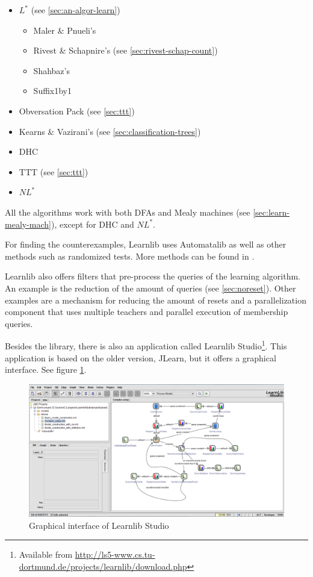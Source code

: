 \documentclass[multi,crop=false,class=article]{standalone}
\begin{document}
\begin{itemize}
	\item $L^*$ (see \cref{sec:an-algor-learn})
	\begin{itemize}
		\item Maler \& Pnueli's \cite{Maler1995}
		\item Rivest \& Schapnire's (see \cref{sec:rivest-schap-count})
		\item Shahbaz's \cite{Shahbaz2009}
		\item Suffix1by1 \cite{Irfan2010}
	\end{itemize}
	\item Obversation Pack (see \cref{sec:ttt})
	\item Kearns \& Vazirani's (see \cref{sec:classification-trees})
	\item DHC \cite{Merten2012}
	\item TTT (see \cref{sec:ttt})
	\item $NL^*$ \cite{Bollig2009}
\end{itemize}

All the algorithms work with both DFAs and Mealy machines (see 
\cref{sec:learn-mealy-mach}), except for DHC\cite{Merten2012} and
$NL^*$\cite{Bollig2009}.

For finding the counterexamples, Learnlib uses Automatalib as well as other
methods such as randomized tests. More methods can be found in
\cite[p. 490]{Isberner2015b}.

Learnlib also offers filters that pre-process the queries of the learning
algorithm. An example is the reduction of the amount of queries (see 
\cref{sec:noreset}). Other examples are a mechanism for reducing the amount of
resets  and a parallelization component that uses multiple teachers and
parallel execution of membership queries\cite{Henrix2015,Howar2012}.


Besides the library, there is also an application called Learnlib 
Studio\footnote{Available from 
\url{http://ls5-www.cs.tu-dortmund.de/projects/learnlib/download.php}}. 
This application is based on the older version, JLearn, but it offers a 
graphical interface. See figure \ref{fig:learnlib_studio}. 

	\begin{figure}[H]
		\includegraphics[width=\textwidth]{Tool_images/learnlib_studio_interface.png}
		\caption{Graphical interface of Learnlib Studio}
		\label{fig:learnlib_studio}
	\end{figure}
\end{document}
